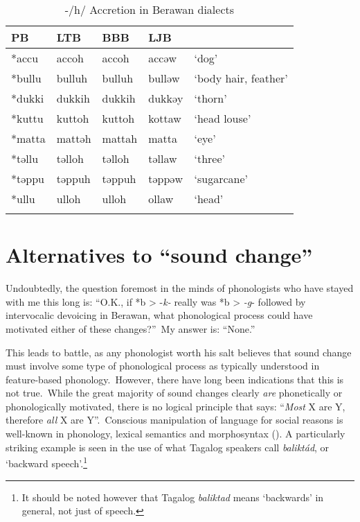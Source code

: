 \documentclass[output=paper]{langscibook}
\begin{document}
\begin{table}
\caption{\label{tab:Accretion-Berewan}-/h/ Accretion in Berawan dialects}
\begin{tabular}{lllll}
\lsptoprule
PB     &  LTB   &   BBB   & LJB     &                        \\
\midrule
*accu  &  accoh &   accoh &   accəw  & `dog'                   \\
*bullu &  bulluh&   bulluh&   bulləw & `body hair, feather'  \\
*dukki &  dukkih&   dukkih&   dukkəy & `thorn'               \\
*kuttu &  kuttoh&   kuttoh&   kottaw & `head louse'          \\
*matta &  mattəh&   mattah&   matta  & `eye'                  \\
*təllu &  təlloh&   təlloh&   təllaw & `three'               \\
*təppu &  təppuh&   təppuh&   təppəw & `sugarcane'           \\
*ullu  &  ulloh &   ulloh &   ollaw  & `head'                    \\
\lspbottomrule
\end{tabular}
\end{table}

\section{Alternatives to ``sound change''}\label{sec:Alt-to-sound-change}
Undoubtedly, the question foremost in the minds of phonologists who have stayed with me this long is: “O.K., if *b > -\textit{k-} really was *b > \textit{-g}- followed by intervocalic devoicing in Berawan, what phonological process could have motivated either of these changes?”~My answer is: “None.”


This leads to battle, as any phonologist worth his salt believes that sound change must involve some type of phonological process as typically understood in feature-based phonology.~However, there have long been indications that this is not true.~While the great majority of sound changes clearly \textit{are} phonetically or phonologically motivated, there is no logical principle that says: “\textit{Most} X are Y, therefore \textit{all} X are Y”.~Conscious manipulation of language for social reasons is well-known in phonology, lexical semantics and morphosyntax (\citealt{Conklin1956,Li1980,Li1982,Li2004,Hale1971,Blust1980,Thomason2007}). A particularly striking example is seen in the use of what Tagalog speakers call \textit{baliktád}, or ‘backward speech’.\footnote{It should be noted however that Tagalog \textit{baliktad} means ‘backwards’ in general, not just of speech.}
\end{document}
